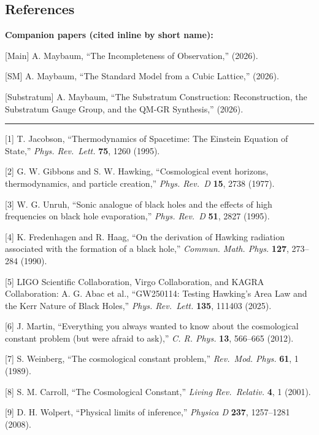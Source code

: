 \documentclass[
]{article}
\begin{document}
\hypertarget{references}{%
\subsection{References}\label{references}}

\textbf{Companion papers (cited inline by short name):}

{[}Main{]} A. Maybaum, ``The Incompleteness of Observation,'' (2026).

{[}SM{]} A. Maybaum, ``The Standard Model from a Cubic Lattice,''
(2026).

{[}Substratum{]} A. Maybaum, ``The Substratum Construction:
Reconstruction, the Substratum Gauge Group, and the QM-GR Synthesis,''
(2026).

\begin{center}\rule{0.5\linewidth}{0.5pt}\end{center}

{[}1{]} T. Jacobson, ``Thermodynamics of Spacetime: The Einstein
Equation of State,'' \emph{Phys. Rev.~Lett.} \textbf{75}, 1260 (1995).

{[}2{]} G. W. Gibbons and S. W. Hawking, ``Cosmological event horizons,
thermodynamics, and particle creation,'' \emph{Phys. Rev.~D}
\textbf{15}, 2738 (1977).

{[}3{]} W. G. Unruh, ``Sonic analogue of black holes and the effects of
high frequencies on black hole evaporation,'' \emph{Phys. Rev.~D}
\textbf{51}, 2827 (1995).

{[}4{]} K. Fredenhagen and R. Haag, ``On the derivation of Hawking
radiation associated with the formation of a black hole,'' \emph{Commun.
Math. Phys.} \textbf{127}, 273--284 (1990).

{[}5{]} LIGO Scientific Collaboration, Virgo Collaboration, and KAGRA
Collaboration: A. G. Abac et al., ``GW250114: Testing Hawking's Area Law
and the Kerr Nature of Black Holes,'' \emph{Phys. Rev.~Lett.}
\textbf{135}, 111403 (2025).

{[}6{]} J. Martin, ``Everything you always wanted to know about the
cosmological constant problem (but were afraid to ask),'' \emph{C. R.
Phys.} \textbf{13}, 566--665 (2012).

{[}7{]} S. Weinberg, ``The cosmological constant problem,''
\emph{Rev.~Mod. Phys.} \textbf{61}, 1 (1989).

{[}8{]} S. M. Carroll, ``The Cosmological Constant,'' \emph{Living
Rev.~Relativ.} \textbf{4}, 1 (2001).

{[}9{]} D. H. Wolpert, ``Physical limits of inference,'' \emph{Physica
D} \textbf{237}, 1257--1281 (2008).
\end{document}
